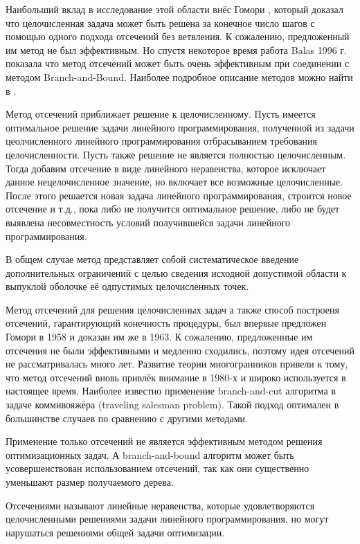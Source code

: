 \documentclass[a4paper,14pt,russian]{extreport}
\begin{document}
Наибольший вклад в исследование этой области внёс Гомори \cite{gomory} \cite{gomory_1}, который доказал что целочисленная задача может быть решена за конечное число шагов с помощью одного подхода отсечений без ветвления. К сожалению, предложенный им метод не был эффективным. Но спустя некоторое время работа Balas \cite{balas_ceria_corn_natraj} 1996 г. показала что метод отсечений может быть очень эффективным при соединении с методом Branch-and-Bound. Наиболее подробное описание методов можно найти в \cite{klar} \cite{wolter} \cite{marchand} \cite{fuegenschuh}.
\par Метод отсечений приближает решение к целочисленному. Пусть имеется оптимальное решение задачи линейного программирования, полученной из задачи цеолчисленного линейного программирования отбрасыванием требования целочисленности. Пусть также решение не является полностью целочисленным. Тогда добавим отсечение в виде линейного неравенства, которое исключает данное нецелочисленное значение, но включает все возможные целочисленные. После этого решается новая задача линейного программирования, строится новое отсечение и т.д., пока либо не получится оптимальное решение, либо не будет выявлена несовместность условий получившейся задачи линейного программирования. 
\par В общем случае метод представляет собой систематическое введение дополнительных ограничений с целью сведения исходной допустимой области к выпуклой оболочке её одпустимых целочисленных точек.
\par Метод отсечений для решения целочисленных задач а также способ построеня отсечений, гарантирующий конечность процедуры, был впервые предложен Гомори в 1958 \cite{gomory_1} и доказан им же в 1963\cite{gomory}. К сожалению, предложенные им отсечения не были эффективными и медленно сходились, поэтому идея отсечений не рассматривалась много лет. Развитие теории многогранников привели к тому, что метод отсечений вновь привлёк внимание в 1980-х и широко используется в настоящее время. Наиболее известно применение branch-and-cut алгоритма в задаче коммивояжёра (traveling salesman problem). Такой подход оптимален в большинстве случаев по сравнению с другими методами. 
\par Применение только отсечений не является эффективным методом решения оптимизационных задач. А branch-and-bound алгоритм может быть усовершенствован использованием отсечений, так как они существенно уменьшают размер получаемого дерева.
\par Отсечениями называют линейные неравенства, которые удовлетворяются целочисленными решениями задачи линейного программирования, но могут нарушаться решениями общей задачи оптимизации.
\end{document}
